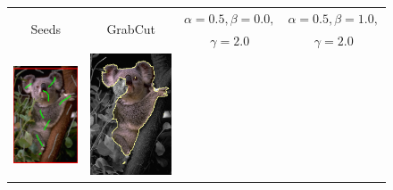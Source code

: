 \begin{figure}[]
\center
\begin{tabular}{cccc}
\multirow{2}{*}{Seeds} & \multirow{2}{*}{GrabCut} & $\alpha=0.5, \beta=0.0,$ & $\alpha=0.5, \beta=1.0,$\\
& & $\gamma=2.0$ & $\gamma=2.0$\\
 	\includegraphics[scale=0.25]{figures/chapter7/segmentation/coala/k-0.0/seeds.png} & 
 	\includegraphics[scale=0.25]{figures/chapter7/segmentation/coala/k-0.0/gc-seg.png} &  	

\end{tabular}
\end{figure}

